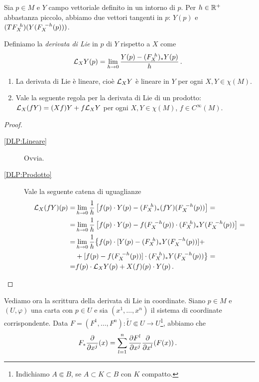 Sia $p\in M$ e $Y$ campo vettoriale definito in un intorno di $p$. Per $h\in\mathbb R^+$ abbastanza piccolo, abbiamo due vettori tangenti in $p$: $Y(p)$ e $(TF_{X}^{\ h})(Y(F_{X}^{\ -h}(p)))$.

\begin{definition} 
	Definiamo la \emph{derivata di Lie} in $p$ di $Y$ rispetto a $X$ come \begin{equation*}\mathcal L_XY(p)=\lim_{h\to 0}\frac{Y(p)-(F_{X}^{\ h})_*Y(p)}h \, \text{. }
	\end{equation*}
\end{definition}

\begin{proposition} \label{prop:DerLieProprieta}
	\begin{enumerate}
		\item La derivata di Lie è lineare, cioè $\mathcal L_XY$ è lineare in $Y$ per ogni $X,Y\in\chi(M)$. \label{DLP:Lineare}
		\item Vale la seguente regola per la derivata di Lie di un prodotto: $\mathcal L_X(fY)=(Xf)Y+f\mathcal L_XY$ per ogni $X,Y\in\chi(M)$, $f\in C^\infty(M)$. \label{DLP:Prodotto}
	\end{enumerate}
\end{proposition}

\begin{proof}
	\begin{description}
	 \item [\ref{DLP:Lineare}] Ovvia.
	 \item [\ref{DLP:Prodotto}] Vale la seguente catena di uguaglianze
	 \begin{equation*}
	 \begin{split}
	 \mathcal L_X(fY)(p)= & \lim_{h\to 0} \frac 1h \left[f(p)\cdot Y(p)-(F_{X}^{\ h})_*(fY)(F_{X}^{\ -h}(p))\right]=\\
	 = & \lim_{h\to 0}\frac 1h \left[f(p)\cdot Y(p)-f(F_{X}^{\ -h}(p)) \cdot (F_{X}^{\ h})_*Y(F_{X}^{\ -h}(p))\right]=\\
	 = & \lim_{h\to 0}\frac 1h \big\{f(p)\cdot[Y(p)-(F_{X}^{\ h})_*Y(F_{X}^{\ -h}(p))]+\\ &+[f(p)-f(F_{X}^{\ -h}(p))]\cdot(F_{X}^{\ h})_*Y(F_{X}^{\ -h}(p))\big\}=\\
	 = & f(p)\cdot\mathcal L_XY(p)+X(f)(p)\cdot Y(p) \, \text{. }
	 \end{split}
	 \end{equation*}
	 \end{description}
\end{proof}

Vediamo ora la scrittura della derivata di Lie in coordinate. Siano $p\in M$ e $(U,\varphi)$ una carta con $p\in U$ e sia $(x^1,\ldots,x^n)$ il sistema di coordinate corrispondente.
Data $F=(F^1,\ldots,F^n):\tilde U \Subset U \to U$\footnote{Indichiamo $A\Subset B$, se $A\subset K \subset B$ con $K$ compatto.}, abbiamo che \begin{equation*}
	F_*\frac\partial{\partial x^j}(x)=\sum_{l=1}^n \frac{\partial F^l}{\partial x^j}\frac\partial{\partial x^l}(F(x))\, \text{. }
\end{equation*}

